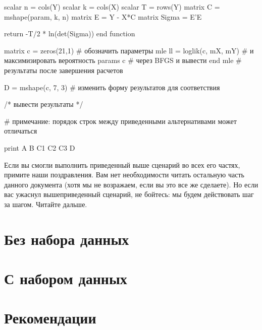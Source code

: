 \documentclass[oneside]{book}
\begin{document}
\begin{scode}
    scalar n = cols(Y)
    scalar k = cols(X)
    scalar T = rows(Y)
    matrix C = mshape(param, k, n)
    matrix E = Y - X*C
    matrix Sigma = E'E

    return -T/2 * ln(det(Sigma))
end function

matrix c = zeros(21,1)                  # обозначить параметры
mle ll = loglik(c, mX, mY)              # и максимизировать вероятность
    params c                            # через BFGS и вывести 
end mle                                 # результаты после завершения расчетов

D = mshape(c, 7, 3)                     # изменить форму результатов для соответствия

/* вывести результаты */

# примечание: порядок строк между приведенными альтернативами может отличаться

print A B C1 C2 C3 D
\end{scode}

Если вы смогли выполнить приведенный выше сценарий во всех его частях,
примите наши поздравления. Вам нет необходимости читать остальную
часть данного документа (хотя мы не возражаем, если вы это все же
сделаете). Но если вас ужаснул вышеприведенный сценарий, не бойтесь:
мы будем действовать шаг за шагом. Читайте дальше.

\part{Без набора данных}
\label{part:hp-nodata}








\part{С набором данных}
\label{part:hp-data}




\part{Рекомендации}
\label{part:hp-reference}

% 



% 

% 
\end{document}
